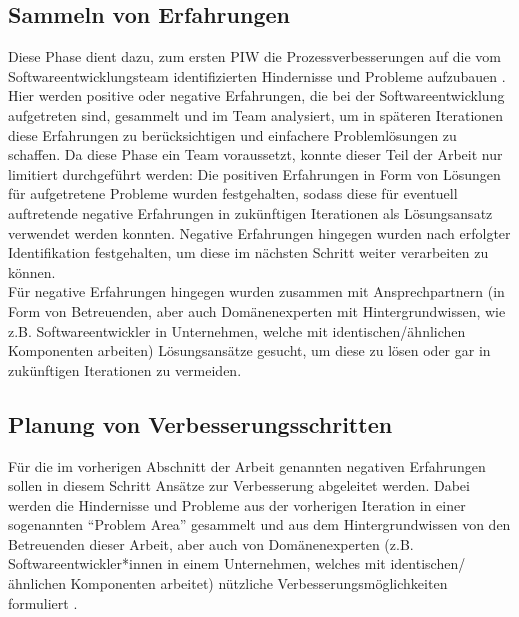 \subsection{Sammeln von Erfahrungen}
Diese Phase dient dazu, zum ersten PIW die Prozessverbesserungen auf die vom Softwareentwicklungsteam identifizierten Hindernisse und Probleme aufzubauen \cite{salo2007iterative}. Hier werden positive oder negative Erfahrungen, die bei der Softwareentwicklung aufgetreten sind, gesammelt und im Team analysiert, um in späteren Iterationen diese Erfahrungen zu berücksichtigen und einfachere Problemlösungen zu schaffen. Da diese Phase ein Team voraussetzt, konnte dieser Teil der Arbeit nur limitiert durchgeführt werden: Die positiven Erfahrungen in Form von Lösungen für aufgetretene Probleme wurden festgehalten, sodass diese für eventuell auftretende negative Erfahrungen in zukünftigen Iterationen als Lösungsansatz verwendet werden konnten. Negative Erfahrungen hingegen wurden nach erfolgter Identifikation festgehalten, um diese im nächsten Schritt weiter verarbeiten zu können. \\
Für negative Erfahrungen hingegen wurden zusammen mit Ansprechpartnern (in Form von Betreuenden, aber auch Domänenexperten mit Hintergrundwissen, wie z.B. Softwareentwickler in Unternehmen, welche mit identischen/ähnlichen Komponenten arbeiten) Lösungsansätze gesucht, um diese zu lösen oder gar in zukünftigen Iterationen zu vermeiden.

\subsection{Planung von Verbesserungsschritten}
Für die im vorherigen Abschnitt der Arbeit genannten negativen Erfahrungen sollen in diesem Schritt Ansätze zur Verbesserung abgeleitet werden. Dabei werden die Hindernisse und Probleme aus der vorherigen Iteration in einer sogenannten \enquote{Problem Area} gesammelt und aus dem Hintergrundwissen von den Betreuenden dieser Arbeit, aber auch von Domänenexperten (z.B. Softwareentwickler*innen in einem Unternehmen, welches mit identischen/ähnlichen Komponenten arbeitet) nützliche Verbesserungsmöglichkeiten formuliert \cite{salo2007iterative}. 

